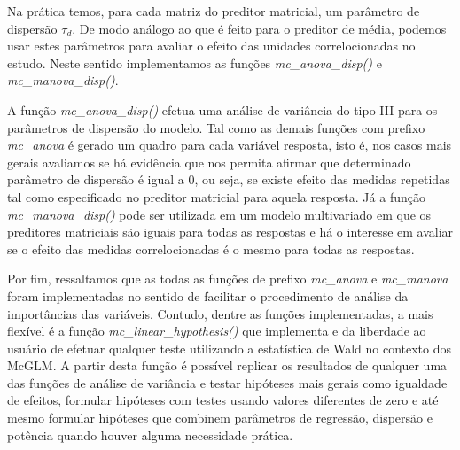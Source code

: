 Na prática temos, para cada matriz do preditor matricial, um parâmetro de dispersão $\tau_d$. De modo análogo ao que é feito para o preditor de média, podemos usar estes parâmetros para avaliar o efeito das unidades correlocionadas no estudo. Neste sentido implementamos as funções \emph{mc\_anova\_disp()} e \emph{mc\_manova\_disp()}. 

A função \emph{mc\_anova\_disp()} efetua uma análise de variância do tipo III para os parâmetros de dispersão do modelo. Tal como as demais funções com prefixo \emph{mc\_anova} é gerado um quadro para cada variável resposta, isto é, nos casos mais gerais avaliamos se há evidência que nos permita afirmar que determinado parâmetro de dispersão é igual a 0, ou seja, se existe efeito das medidas repetidas tal como especificado no preditor matricial para aquela resposta. Já a função \emph{mc\_manova\_disp()} pode ser utilizada em um modelo multivariado em que os preditores matriciais são iguais para todas as respostas e há o interesse em avaliar se o efeito das medidas correlocionadas é o mesmo para todas as respostas.

Por fim, ressaltamos que as todas as funções de prefixo \emph{mc\_anova} e \emph{mc\_manova} foram implementadas no sentido de facilitar o procedimento de análise da importâncias das variáveis. Contudo, dentre as funções implementadas, a mais flexível é a função \emph{mc\_linear\_hypothesis()} que implementa e da liberdade ao usuário de efetuar qualquer teste utilizando a estatística de Wald no contexto dos McGLM. A partir desta função é possível replicar os resultados de qualquer uma das funções de análise de variância e testar hipóteses mais gerais como igualdade de efeitos, formular hipóteses com testes usando valores diferentes de zero e até mesmo formular hipóteses que combinem parâmetros de regressão, dispersão e potência quando houver alguma necessidade prática.
